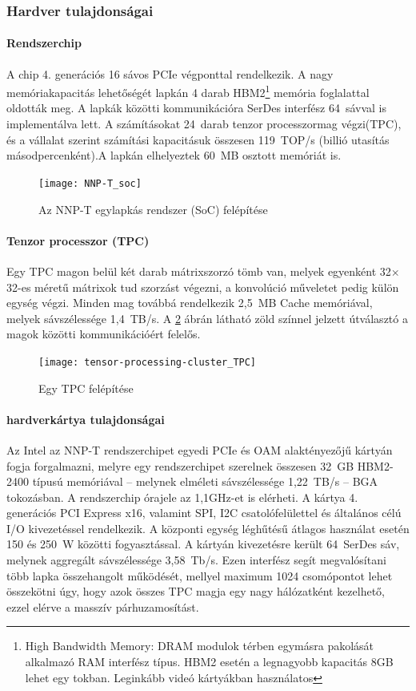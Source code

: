 \subsubsection{Hardver tulajdonságai}
\paragraph[Soc]{Rendszerchip}
A chip 4. generációs 16 sávos PCIe végponttal rendelkezik. A nagy memóriakapacitás lehetőségét lapkán 4 darab HBM2\footnote{High Bandwidth Memory: DRAM modulok térben egymásra pakolását alkalmazó RAM interfész típus. HBM2 esetén a legnagyobb kapacitás 8GB lehet egy tokban. Leginkább videó kártyákban használatos } memória foglalattal oldották meg. A lapkák közötti kommunikációra SerDes interfész 64~sávval is implementálva lett.
A számításokat 24~darab tenzor processzormag végzi(TPC), és a vállalat szerint számítási kapacitásuk összesen 119~TOP/s (billió utasítás másodpercenként).A lapkán elhelyeztek 60~MB osztott memóriát is.
\begin{figure}[H]
	\centering
	\texttt{[image: NNP-T\_soc]}
	\caption[SoC]{Az NNP-T egylapkás rendszer (SoC) felépítése}
	\label{fig:nnp-tsoc}
\end{figure}

\paragraph{Tenzor processzor (TPC)}
Egy TPC magon belül két darab mátrixszorzó tömb van, melyek egyenként 32$\times$32-es méretű mátrixok tud szorzást végezni, a konvolúció műveletet pedig külön egység végzi. Minden mag továbbá rendelkezik 2,5~MB Cache memóriával, melyek sávszélessége 1,4~TB/s. A \ref{fig:TPC} ábrán látható zöld színnel jelzett útválasztó a magok közötti kommunikációért felelős. 
\begin{figure}[H]
	\centering
	\texttt{[image: tensor-processing-cluster\_TPC]}
	\caption[TPC]{Egy TPC felépítése}
	\label{fig:TPC}
\end{figure}

\paragraph{hardverkártya tulajdonságai}
Az Intel az NNP-T rendszerchipet egyedi PCIe és OAM alaktényezőjű kártyán fogja forgalmazni, melyre egy rendszerchipet szerelnek összesen 32~GB HBM2-2400 típusú memóriával -- melynek elméleti sávszélessége 1,22~TB/s -- BGA tokozásban.
A rendszerchip órajele az 1,1GHz-et is elérheti. A kártya 4. generációs PCI Express x16, valamint SPI, I2C csatolófelülettel és általános célú I/O kivezetéssel rendelkezik. A központi egység léghűtésű átlagos használat esetén 150 és 250~W közötti fogyasztással. A kártyán kivezetésre került 64~SerDes sáv, melynek aggregált sávszélessége 3,58~Tb/s. Ezen interfész segít megvalósítani több lapka összehangolt működését, mellyel maximum 1024 csomópontot lehet összekötni úgy, hogy azok összes TPC magja egy nagy hálózatként kezelhető, ezzel elérve a masszív párhuzamosítást. 

